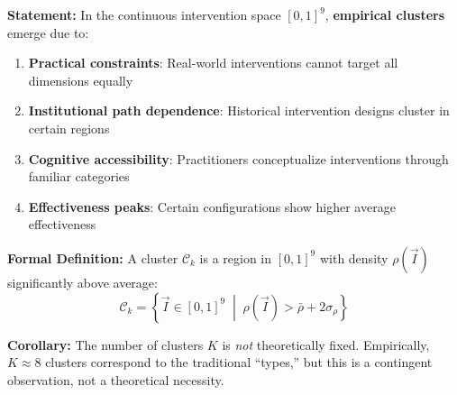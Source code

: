 \begin{tcolorbox}[colback=blue!5!white, colframe=blue!75!black,
    title=\textbf{Axiom EIT-3: Cluster Emergence (Type Formation)}]

\textbf{Statement:} In the continuous intervention space $[0,1]^9$, \textbf{empirical clusters} emerge due to:
\begin{enumerate}[nosep]
    \item \textbf{Practical constraints}: Real-world interventions cannot target all dimensions equally
    \item \textbf{Institutional path dependence}: Historical intervention designs cluster in certain regions
    \item \textbf{Cognitive accessibility}: Practitioners conceptualize interventions through familiar categories
    \item \textbf{Effectiveness peaks}: Certain configurations show higher average effectiveness
\end{enumerate}

\textbf{Formal Definition:} A cluster $\mathcal{C}_k$ is a region in $[0,1]^9$ with density $\rho(\vec{I})$ significantly above average:
\begin{equation}
\mathcal{C}_k = \left\{ \vec{I} \in [0,1]^9 \;\middle|\; \rho(\vec{I}) > \bar{\rho} + 2\sigma_\rho \right\}
\end{equation}

\textbf{Corollary:} The number of clusters $K$ is \textit{not} theoretically fixed. Empirically, $K \approx 8$ clusters correspond to the traditional ``types,'' but this is a contingent observation, not a theoretical necessity.
\end{tcolorbox}

